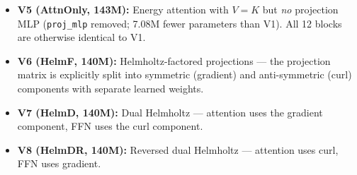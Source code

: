 \documentclass[11pt,a4paper]{article}
\begin{document}
\begin{itemize}
  \item \textbf{V5 (AttnOnly, 143M):} Energy attention with $V{=}K$ but \emph{no}
    projection MLP (\texttt{proj\_mlp} removed; 7.08M fewer parameters than V1).
    All 12 blocks are otherwise identical to V1.
  \item \textbf{V6 (HelmF, 140M):} Helmholtz-factored projections --- the projection
    matrix is explicitly split into symmetric (gradient) and anti-symmetric (curl)
    components with separate learned weights.
  \item \textbf{V7 (HelmD, 140M):} Dual Helmholtz --- attention uses the gradient
    component, FFN uses the curl component.
  \item \textbf{V8 (HelmDR, 140M):} Reversed dual Helmholtz --- attention uses curl,
    FFN uses gradient.
\end{itemize}

\begin{table}[h]
\centering
\caption{V5--V8 ablation results at 30k steps (7.86B tokens), 160M scale.
  ``Avg'' = mean over 9 zero-shot tasks. V0 GPT and V1 EGPT repeated for reference.
  WikiText PPL lower is better; zero-shot accuracy higher is better.}
\label{tab:v5_v8}
\end{table}
\end{document}
